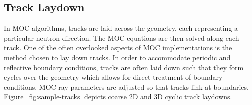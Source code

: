 \documentclass[12pt,twoside]{mitthesis-exec}
\begin{document}

\subsection*{Track Laydown}

In MOC algorithms, tracks are laid across the geometry, each representing a particular neutron direction. The MOC equations are then solved along each track. One of the often overlooked aspects of MOC implementations is the method chosen to lay down tracks. In order to accommodate periodic and reflective boundary conditions, tracks are often laid down such that they form cycles over the geometry which allows for direct treatment of boundary conditions. MOC ray parameters are adjusted so that tracks link at boundaries. Figure~\ref{fig:sample-tracks} depicts coarse 2D and 3D cyclic track laydowns.
\end{document}
